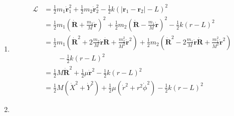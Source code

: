 \documentclass{article}
\renewcommand{\vec}[1]{\boldsymbol{\mathbf{#1}}}
\newcommand{\dvec}[1]{\dot{\vec{#1}}}
\begin{document}
\begin{enumerate}
  \item

        \begin{align*}
          \mathcal{L} & = \frac{1}{2} m_1 \dvec{r}_1^2 + \frac{1}{2} m_2 \dvec{r}_2^2 - \frac{1}{2} k (|\vec{r}_1 - \vec{r}_2| - L)^2                                                                                                                 \\
                      & = \frac{1}{2} m_1 \left( \dvec{R} + \frac{m_2}{M} \dvec{r} \right)^2 + \frac{1}{2} m_2 \left( \dvec{R} - \frac{m_1}{M} \dvec{r} \right)^2 - \frac{1}{2} k (r - L)^2                                                           \\
                      & = \frac{1}{2} m_1 \left( \dvec{R}^2 + 2 \frac{m_2}{M} \dvec{r} \dvec{R} + \frac{m_2^2}{M^2} \dvec{r}^2 \right) + \frac{1}{2} m_2 \left( \dvec{R}^2 - 2 \frac{m_1}{M} \dvec{r} \dvec{R} + \frac{m_1^2}{M^2} \dvec{r}^2 \right) \\
                      & \qquad - \frac{1}{2} k (r - L)^2                                                                                                                                                                                              \\
                      & = \frac{1}{2} M \dvec{R}^2 + \frac{1}{2} \mu \dvec{r}^2 - \frac{1}{2} k (r - L)^2                                                                                                                                             \\
                      & = \frac{1}{2} M (\dot{X}^2 + \dot{Y}^2) + \frac{1}{2} \mu (\dot{r}^2 + r^2 \dot{\phi}^2) - \frac{1}{2} k (r - L)^2
        \end{align*}

  \item


\end{enumerate}
\end{document}
